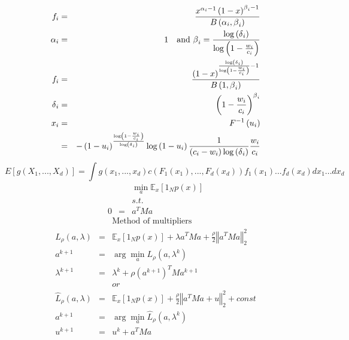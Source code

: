 \documentclass{article}
\begin{document}
\begin{eqnarray*}
f_{i} &=&\frac{x^{\alpha _{i}-1}\left( 1-x\right) ^{\beta _{i}-1}}{B\left(
\alpha _{i},\beta _{i}\right) } \\
\alpha _{i} &=&1\text{ and }\beta _{i}=\frac{\log \left( \delta _{i}\right) 
}{\log \left( 1-\frac{w_{i}}{c_{i}}\right) } \\
f_{i} &=&\frac{\left( 1-x\right) ^{\frac{\log \left( \delta _{i}\right) }{%
\log \left( 1-\frac{w_{i}}{c_{i}}\right) }-1}}{B\left( 1,\beta _{i}\right) }
\\
\delta _{i} &=&\left( 1-\frac{w_{i}}{c_{i}}\right) ^{\beta _{i}} \\
x_{i} &=&F^{-1}\left( u_{i}\right) \\
&=&-\left( 1-u_{i}\right) ^{\frac{\log \left( 1-\frac{w_{i}}{c_{i}}\right) }{%
\log \left( \delta _{i}\right) }}\log \left( 1-u_{i}\right) \frac{1}{\left(
c_{i}-w_{i}\right) \log \left( \delta _{i}\right) }\frac{w_{i}}{c_{i}}
\end{eqnarray*}%
\[
E\left[ g\left( X_{1},...,X_{d}\right) \right] =\int g\left(
x_{1},...,x_{d}\right) c\left( F_{1}\left( x_{1}\right) ,...,F_{d}\left(
x_{d}\right) \right) f_{1}\left( x_{1}\right) ...f_{d}\left( x_{d}\right)
dx_{1}...dx_{d} 
\]%
\begin{eqnarray*}
&&\min_{a}\mathbb{E}_{x}\left[ 1_{N}p\left( x\right) \right] \\
&&s.t. \\
0 &=&a^{T}Ma
\end{eqnarray*}%
\begin{eqnarray*}
&&\text{Method of multipliers} \\
L_{\rho }\left( a,\lambda \right) &=&\mathbb{E}_{x}\left[ 1_{N}p\left(
x\right) \right] +\lambda a^{T}Ma+\frac{\rho }{2}\left\Vert
a^{T}Ma\right\Vert _{2}^{2} \\
a^{k+1} &=&\arg \min_{a}L_{\rho }\left( a,\lambda ^{k}\right) \\
\lambda ^{k+1} &=&\lambda ^{k}+\rho \left( a^{k+1}\right) ^{T}Ma^{k+1} \\
&&or \\
\hat{L}_{\rho }\left( a,\lambda \right) &=&\mathbb{E}_{x}\left[ 1_{N}p\left(
x\right) \right] +\frac{\rho }{2}\left\Vert a^{T}Ma+u\right\Vert
_{2}^{2}+const \\
a^{k+1} &=&\arg \min_{a}\hat{L}_{\rho }\left( a,\lambda ^{k}\right) \\
u^{k+1} &=&u^{k}+a^{T}Ma
\end{eqnarray*}%
\end{document}
